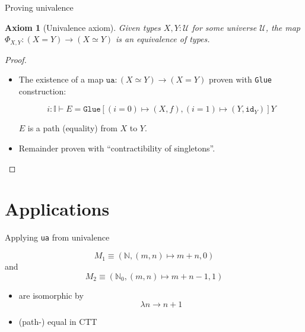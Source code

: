 \documentclass[english]{beamer}
\newtheorem{axiom}[theorem]{Axiom}
\begin{document}
\begin{frame}{Proving univalence}

\begin{axiom}[Univalence axiom]
 Given types $X,Y : \mathcal{U}$ for some universe $\mathcal{U}$, the map $\Phi_{X,Y}: (X=Y) \rightarrow (X \simeq Y)$ is an equivalence of types. 
\end{axiom}


 

\begin{proof}

\begin{itemize}

\item The existence of a map $\texttt{ua} : (X\simeq Y) \rightarrow (X = Y)$ proven with \texttt{Glue} construction:
 
 
 $$i : \mathbb{I} \vdash E= \texttt{Glue} \left[ (i=0) \mapsto (X, f),(i=1) \mapsto\left(Y, \texttt{id}_{Y}\right) \right] Y$$
 
 $E$ is a path (equality) from $X$ to $Y$.
 
 \item Remainder proven with ``contractibility of singletons''.
 
 \end{itemize}
\end{proof} 

\end{frame}


\section{Applications}


\begin{frame}{Applying \texttt{ua} from univalence }
 
 \begin{example}[Monoids]
 
 $$M_1  \equiv (\mathbb{N}, (m,n)\mapsto m+n, 0)$$ and $$M_2 \equiv (\mathbb{N}_0, (m,n)\mapsto m+n -1, 1)$$
\begin{itemize}
 \item  are isomorphic by $$\lambda n \rightarrow n + 1 $$ 
 \item (path-) equal in CTT
\end{itemize}
 
 \end{example}
 

 
\end{frame}
\end{document}
